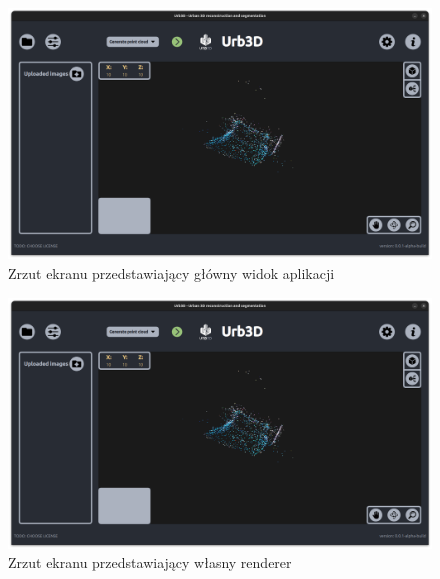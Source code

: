 \begin{figure}[h!]
    \centering
    \begin{minipage}{0.245\textwidth}
        \centering
        \includegraphics[width=\textwidth]{images/UI-Rendering.png}
    \end{minipage}
    \caption{Zrzut ekranu przedstawiający główny widok aplikacji}
    \label{fig:ui-rendering}
\end{figure}

\begin{figure}[h!]
    \centering
    \begin{minipage}{0.245\textwidth}
        \centering
        \includegraphics[width=\textwidth]{images/UI-Rendering.png} %
    \end{minipage}
    \caption{Zrzut ekranu przedstawiający własny renderer}
    \label{fig:rendering}
\end{figure}
